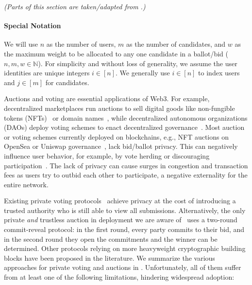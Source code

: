 \textit{(Parts of this section are taken/adapted from \cite{EPRINT:GSZB23}.)}

\paragraph{Special Notation} We will use $n$ as the number of users, $m$ as the number of candidates, and $w$ as the maximum weight to be allocated to any one candidate in a ballot/bid ($n,m,w \in \mathbb{N}$). For simplicity and without loss of generality, we assume the user identities are unique integers $i \in [n]$.
We generally use $i \in [n]$ to index users and $j \in [m]$ for candidates.

Auctions and voting are essential applications of Web3. For example, decentralized marketplaces run auctions to sell digital goods like non-fungible tokens (NFTs)~\cite{opensea_auction} or domain names~\cite{ARXIV:XWYLLX21}, while decentralized autonomous organizations (DAOs) deploy voting schemes to enact decentralized governance~\cite{optimismgov}. Most auction or voting schemes currently deployed on blockchains, e.g., NFT auctions on OpenSea or Uniswap governance~\cite{ARXIV:FriMulWat22}, lack bid/ballot privacy. This can negatively influence user behavior, for example, by vote herding or discouraging participation~\cite{FC:ElkLip04,WTSC:GalYou18,FC:SuzYok03}. The lack of privacy can cause surges in congestion and transaction fees as users try to outbid each other to participate, a negative externality for the entire network.



Existing private voting protocols~\cite{maci,plume,rln} achieve privacy at the cost of introducing a trusted authority who is still able to view all submissions.
Alternatively, the only private \emph{and} trustless auction in deployment we are aware of~\cite{ARXIV:XWYLLX21} uses a two-round commit-reveal protocol: in the first round, every party commits to their bid, and in the second round they open the commitments and the winner can be determined.
Other protocols relying on more heavyweight cryptographic building blocks have been proposed in the literature.
We summarize the various approaches for private voting and auctions in .
Unfortunately, all of them suffer from at least one of the following limitations, hindering widespread adoption:

